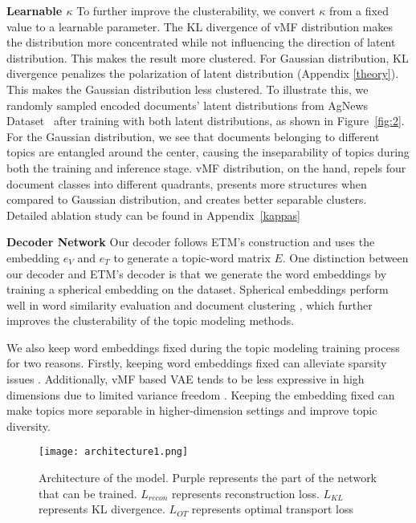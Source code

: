 \documentclass[11pt]{article}
\begin{document}
\textbf{Learnable $\kappa$} To further improve the clusterability, we convert $\kappa$ from a fixed value to a learnable parameter. The KL divergence of vMF distribution makes the distribution more concentrated while not influencing the direction of latent distribution. This makes the result more clustered. For Gaussian distribution, KL divergence penalizes the polarization of latent distribution (Appendix \ref{theory}). This makes the Gaussian distribution less clustered. 
To illustrate this, we randomly sampled encoded documents' latent distributions from AgNews Dataset~\cite{zhang2016characterlevel} after training with both latent distributions, as shown in Figure~\ref{fig:2}.
For the Gaussian distribution, we see that documents belonging to different topics are entangled around the center, causing the inseparability of topics during both the training and inference stage. vMF distribution, on the hand, repels four document classes into different quadrants, presents more structures when compared to Gaussian distribution, and creates better separable clusters. Detailed ablation study can be found in Appendix~\ref{kappas}







\textbf{Decoder Network}
Our decoder follows ETM's construction and uses the embedding $e_{V}$ and $e_{T}$ to generate a topic-word matrix $E$. 
One distinction between our decoder and ETM's decoder is that we generate the word embeddings by training a spherical embedding on the dataset. Spherical embeddings perform well in word similarity evaluation and document clustering \cite{meng2019spherical}, which further improves the clusterability of the topic modeling methods. 

We also keep word embeddings fixed during the topic modeling training process for two reasons. Firstly, keeping word embeddings fixed can alleviate sparsity issues \cite{pmlr-v80-zhao18a}. Additionally, vMF based VAE tends to be less expressive in high dimensions due to limited variance freedom \cite{davidson2018hyperspherical}. Keeping the embedding fixed can make topics more separable in higher-dimension settings and improve topic diversity.

\begin{figure}
\hspace*{-0.4em}\texttt{[image: architecture1.png]}
\caption{Architecture of the model. Purple represents the part of the network that can be trained. $L_{recon}$ represents reconstruction loss. $L_{KL}$ represents KL divergence. $L_{OT}$ represents optimal transport loss}
\label{fig:people4}
\end{figure}
\end{document}
